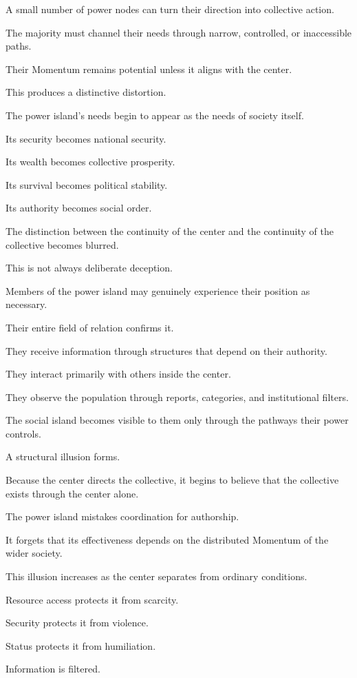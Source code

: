 A small number of power nodes can turn their direction into collective action.

The majority must channel their needs through narrow, controlled, or inaccessible paths.

Their Momentum remains potential unless it aligns with the center.

This produces a distinctive distortion.

The power island’s needs begin to appear as the needs of society itself.

Its security becomes national security.

Its wealth becomes collective prosperity.

Its survival becomes political stability.

Its authority becomes social order.

The distinction between the continuity of the center and the continuity of the collective becomes blurred.

This is not always deliberate deception.

Members of the power island may genuinely experience their position as necessary.

Their entire field of relation confirms it.

They receive information through structures that depend on their authority.

They interact primarily with others inside the center.

They observe the population through reports, categories, and institutional filters.

The social island becomes visible to them only through the pathways their power controls.

A structural illusion forms.

Because the center directs the collective, it begins to believe that the collective exists through the center alone.

The power island mistakes coordination for authorship.

It forgets that its effectiveness depends on the distributed Momentum of the wider society.

This illusion increases as the center separates from ordinary conditions.

Resource access protects it from scarcity.

Security protects it from violence.

Status protects it from humiliation.

Information is filtered.

